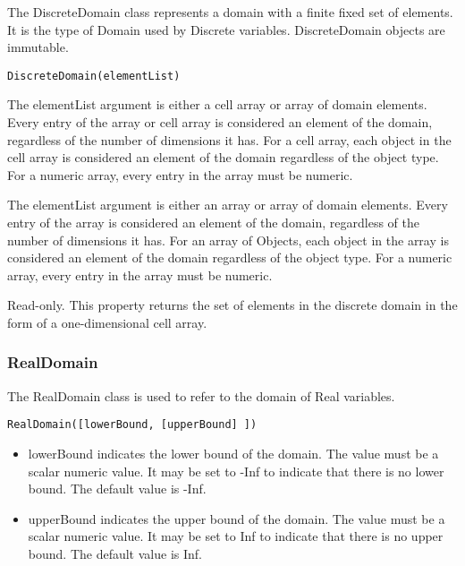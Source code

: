 The DiscreteDomain class represents a domain with a finite fixed set of elements. It is the type of Domain used
by Discrete variables. DiscreteDomain objects are immutable.


\begin{lstlisting}
DiscreteDomain(elementList)
\end{lstlisting}

\ifmatlab
The elementList argument is either a cell array or array of domain elements.  Every entry of the array or cell array is considered an element of the domain, regardless of the number of dimensions it has.  For a cell array, each object in the cell array is considered an element of the domain regardless of the object type.  For a numeric array, every entry in the array must be numeric.
\fi

\ifjava
The elementList argument is either an array or array of domain elements.  Every entry of the array is considered an element of the domain, regardless of the number of dimensions it has.  For an array of Objects, each object in the array is considered an element of the domain regardless of the object type.  For a numeric array, every entry in the array must be numeric.
\fi



Read-only.  This property returns the set of elements in the discrete domain in the form of a one-dimensional \ifmatlab cell \fi array.



\subsubsection{RealDomain}
\label{sec:RealDomain}

The RealDomain class is used to refer to the domain of Real variables.


\ifmatlab
\begin{lstlisting}
RealDomain([lowerBound, [upperBound] ])
\end{lstlisting}

\begin{itemize}
\item lowerBound indicates the lower bound of the domain.  The value must be a scalar numeric value.  It may be set to -Inf to indicate that there is no lower bound.  The default value is -Inf.
\item upperBound indicates the upper bound of the domain.  The value must be a scalar numeric value.  It may be set to Inf to indicate that there is no upper bound.  The default value is Inf.
\end{itemize}

